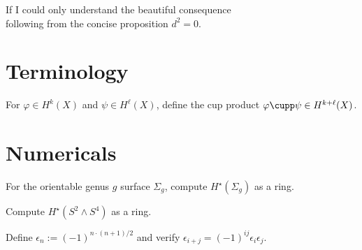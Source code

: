 \documentclass{homework}
\author{Jim Fowler}
\begin{document}
\maketitle

\begin{inspiration}
  If I could only understand the beautiful consequence \\ following from the concise proposition $d^2 = 0$.
\end{inspiration}

\section{Terminology}

\begin{problem}
  For $\varphi \in H^k(X)$ and $\psi \in H^\ell(X)$, define the cup product $\varphi \cupp \psi \in H^{k + \ell}(X)$.
\end{problem}

\section{Numericals}

\begin{problem}
 For the orientable genus $g$ surface $\Sigma_g$, compute $H^\star(\Sigma_g)$ as a ring.
\end{problem}

\begin{problem}
 Compute $H^\star(S^2 \wedge S^4)$ as a ring.
\end{problem}

\begin{problem} Define $\epsilon_n := (-1)^{n \cdot (n+1)/2}$ and
verify $\epsilon_{i+j} = (-1)^{ij} \epsilon_i \epsilon_j$.
\end{problem}

\end{document}
